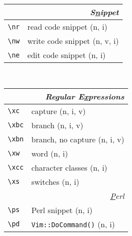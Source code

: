 \documentclass[oneside,10pt,landscape,DIV16]{scrartcl}
\begin{document}
\begin{multicols}{3}
\begin{center}
\begin{tabular}[]{|p{11mm}|p{56mm}|}
\hline
\multicolumn{2}{|r|}{\textsl{S\underline{n}ippet}}                \\[1.0ex]
\hline \verb'\nr'  & read code snippet         \hfill (n, i)   \\
\hline \verb'\nw'  & write code snippet        \hfill (n, v, i)\\
\hline \verb'\ne'  & edit code snippet         \hfill (n, i)   \\
%
\hline
\end{tabular}\\
%
%
\begin{tabular}[]{|p{11mm}|p{60mm}|}
\hline
\multicolumn{2}{|r|}{\textsl{Regular E\underline{x}pressions}}     \\[1.0ex]
\hline \verb'\xc'  & capture                 \hfill (n, i, v)\\
\hline \verb'\xbc' & branch                  \hfill (n, i, v)\\
\hline \verb'\xbn' & branch, no capture      \hfill (n, i, v)\\
\hline \verb'\xw'  & word                    \hfill (n, i)\\
\hline \verb'\xcc' & character classes       \hfill (n, i)\\
\hline \verb'\xs'  & switches                \hfill (n, i)\\
\hline
\hline
\multicolumn{2}{|r|}{\textsl{\underline{P}erl}}                       \\[1.0ex]
\hline \verb'\ps'   & Perl snippet \hfill (n, i)\\
\hline \verb'\pd'   & \texttt{Vim::DoCommand()} \hfill (n, i)\\

\end{tabular}
\end{center}
\end{multicols}
\end{document}
